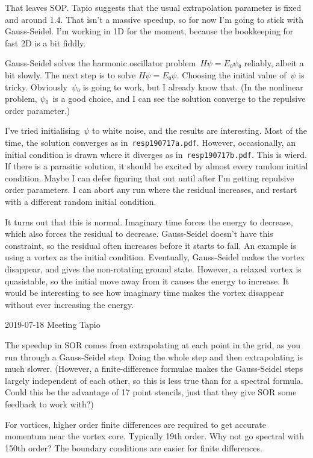 That leaves SOP.  Tapio suggests that the usual extrapolation parameter is fixed and around 1.4.  That isn't a massive speedup, so for now I'm going to stick with Gauss-Seidel.  I'm working in 1D for the moment, because the bookkeeping for fast 2D is a bit fiddly.

Gauss-Seidel solves the harmonic oscillator problem~$Hψ=E₀ψ₀$ reliably, albeit a bit slowly.  The next step is to solve $Hψ=E₀ψ$.  Choosing the initial value of~$ψ$ is tricky.  Obviously~$ψ₀$ is going to work, but I already know that.  (In the nonlinear problem, $ψ₀$~is a good choice, and I can see the solution converge to the repulsive order parameter.)

I've tried initialising~$ψ$ to white noise, and the results are interesting.  Most of the time, the solution converges as in~{\tt resp190717a.pdf}.  However, occasionally, an initial condition is drawn where it diverges as in~{\tt resp190717b.pdf}.  This is wierd.  If there is a parasitic solution, it should be excited by almost every random initial condition.  Maybe I can defer figuring that out until after I'm getting repulsive order parameters.  I can abort any run where the residual increases, and restart with a different random initial condition.

It turns out that this is normal.  Imaginary time forces the energy to decrease, which also forces the residual to decrease.  Gauss-Seidel doesn't have this constraint, so the residual often increases before it starts to fall.  An example is using a vortex as the initial condition.  Eventually, Gauss-Seidel makes the vortex disappear, and gives the non-rotating ground state.  However, a relaxed vortex is quasistable, so the initial move away from it causes the energy to increase.  It would be interesting to see how imaginary time makes the vortex disappear without ever increasing the energy.

2019-07-18 Meeting Tapio

The speedup in SOR comes from extrapolating at each point in the grid, as you run through a Gauss-Seidel step.  Doing the whole step and then extrapolating is much slower.  (However, a finite-difference formulae makes the Gauss-Seidel steps largely independent of each other, so this is less true than for a spectral formula.  Could this be the advantage of 17 point stencils, just that they give SOR some feedback to work with?)

For vortices, higher order finite differences are required to get accurate momentum near the vortex core.  Typically 19th order.  Why not go spectral with 150th order?  The boundary conditions are easier for finite differences.

